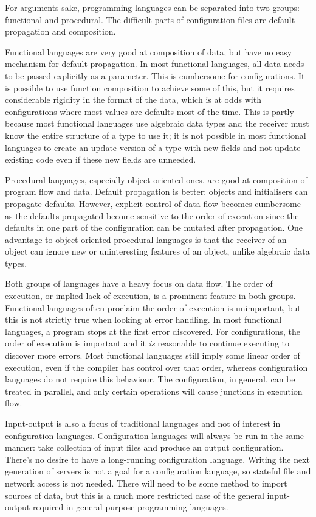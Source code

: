 \documentclass[letterpaper,twocolumn,10pt]{article}
\begin{document}
For arguments sake, programming languages can be separated into two groups: functional and procedural. The difficult parts of configuration files are default propagation and composition.

Functional languages are very good at composition of data, but have no easy mechanism for default propagation. In most functional languages, all data needs to be passed explicitly as a parameter. This is cumbersome for configurations. It is possible to use function composition to achieve some of this, but it requires considerable rigidity in the format of the data, which is at odds with configurations where most values are defaults most of the time. This is partly because most functional languages use algebraic data types and the receiver must know the entire structure of a type to use it; it is not possible in most functional languages to create an update version of a type with new fields and not update existing code even if these new fields are unneeded.

Procedural languages, especially object-oriented ones, are good at composition of program flow and data. Default propagation is better: objects and initialisers can propagate defaults. However, explicit control of data flow becomes cumbersome as the defaults propagated become sensitive to the order of execution since the defaults in one part of the configuration can be mutated after propagation. One advantage to object-oriented procedural languages is that the receiver of an object can ignore new or uninteresting features of an object, unlike algebraic data types.

Both groups of languages have a heavy focus on data flow. The order of execution, or implied lack of execution, is a prominent feature in both groups. Functional languages often proclaim the order of execution is unimportant, but this is not strictly true when looking at error handling. In most functional languages, a program stops at the first error discovered. For configurations, the order of execution is important and it \emph{is} reasonable to continue executing to discover more errors. Most functional languages still imply some linear order of execution, even if the compiler has control over that order, whereas configuration languages do not require this behaviour. The configuration, in general, can be treated in parallel, and only certain operations will cause junctions in execution flow.

Input-output is also a focus of traditional languages and not of interest in configuration languages. Configuration languages will always be run in the same manner: take collection of input files and produce an output configuration. There's no desire to have a long-running configuration language. Writing the next generation of servers is not a goal for a configuration language, so stateful file and network access is not needed. There will need to be some method to import sources of data, but this is a much more restricted case of the general input-output required in general purpose programming languages. 
\end{document}
